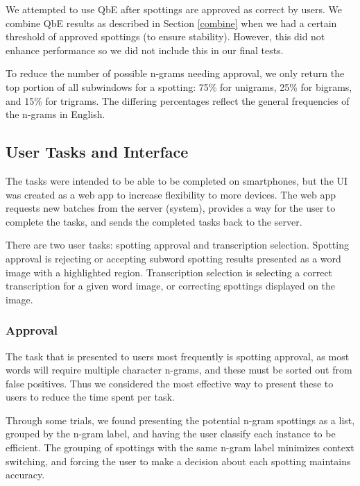 \documentclass[ms,electronic,twosidetoc,letterpaper,chaptercenter,parttop,lof,lot]{byumsphd}
\begin{document}
We attempted to use QbE after spottings are approved as correct by users. We combine QbE results as described in Section \ref{combine} when we had a certain threshold of approved spottings (to ensure stability). However, this did not enhance performance so we did not include this in our final tests.

To reduce the number of possible n-grams needing approval, we only return the top portion of all subwindows for a spotting: 75\% for unigrams, 25\% for bigrams, and 15\% for trigrams. The differing percentages reflect the general frequencies of the n-grams in English.

\subsection{User Tasks and Interface}

The tasks were intended to be able to be completed on smartphones, but the UI was created as a web app to increase flexibility to more devices. The web app requests new batches from the server (system), provides a way for the user to complete the tasks, and sends the completed tasks back to the server.

There are two user tasks: spotting approval and transcription selection. Spotting approval is rejecting or accepting subword spotting results presented as a word image with a highlighted region. Transcription selection is selecting a correct transcription for a given word image, or correcting spottings displayed on the image. 

\subsubsection{Approval}

The task that is presented to users most frequently is spotting approval, as most words will require multiple character n-grams, and these must be sorted out from false positives. Thus we considered the most effective way to present these to users to reduce the time spent per task.


Through some trials, we found presenting the potential n-gram spottings as a list, grouped by the n-gram label, and having the user classify each instance to be efficient. The grouping of spottings with the same n-gram label minimizes context switching, and forcing the user to make a decision about each spotting maintains accuracy.
\end{document}
